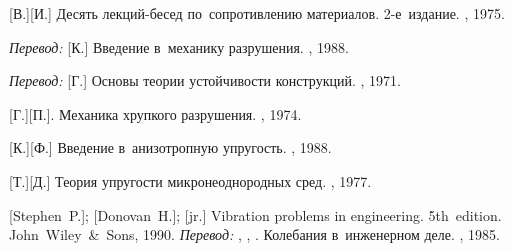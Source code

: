 \begin{thebibliography}{123}
\begin{otherlanguage}{russian}
[В.][И.]
Десять лекций\hbox{-}бесед по~сопротивлению материалов.
2\hbox{-}е~издание.
\naukapublisher, 1975.

\emph{Перевод:}
[К.]
Введение в~механику разрушения.
\mirpublisher,
1988.

\emph{Перевод:}
[Г.]
Основы теории устойчивости конструкций.
\mirpublisher, 1971.

[Г.][П.].
Механика хрупкого разрушения.
\naukapublisher, 1974.

[К.][Ф.]
Введение в~анизотропную упругость.
\naukapublisher,
1988.


[Т.][Д.]
Теория упругости микронеоднородных сред.
\naukapublisher,
1977.

%
%



[Stephen~P.];
[Donovan~H.];
[jr.]
Vibration problems in engineering.
5th~edition.
John~Wiley~\&~Sons, 1990.
\emph{Перевод:} ,
,
.
Колебания в~инженерном деле.
\maschinenbaumoskauerverlag, 1985.


\end{otherlanguage}
\end{thebibliography}
